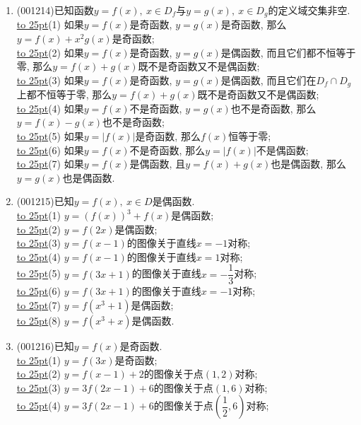 \documentclass[10pt,a4paper]{article}
\newcommand{\blank}[1]{\underline{\hbox to #1pt{}}}
\begin{document}
\begin{enumerate}[1.]
\blank{25}(10) 如果$y=(f(x))^2$是偶函数, 那么$y=f(x)$是偶函数或者是奇函数;\\ 
\blank{25}(11) 如果$y=(f(x))^2$是奇函数, 那么$y=f(x)$恒等于零, 因此是奇函数也是偶函数;\\ 
\blank{25}(12) 如果$y=(f(x))^3$是奇函数, 那么$y=f(x)$是奇函数.
\item {\tiny (001214)}已知函数$y=f(x),\ x \in D_f$与$y=g(x),\ x \in D_g$的定义域交集非空.\\ 
\blank{25}(1) 如果$y=f(x)$是奇函数, $y=g(x)$是奇函数, 那么$y=f(x)+x^2g(x)$是奇函数;\\ 
\blank{25}(2) 如果$y=f(x)$是奇函数, $y=g(x)$是偶函数, 而且它们都不恒等于零, 那么$y=f(x)+g(x)$既不是奇函数又不是偶函数;\\ 
\blank{25}(3) 如果$y=f(x)$是奇函数, $y=g(x)$是偶函数, 而且它们在$D_f\cap D_g$上都不恒等于零, 那么$y=f(x)+g(x)$既不是奇函数又不是偶函数;\\ 
\blank{25}(4) 如果$y=f(x)$不是奇函数, $y=g(x)$也不是奇函数, 那么$y=f(x)-g(x)$也不是奇函数;\\ 
\blank{25}(5) 如果$y=|f(x)|$是奇函数, 那么$f(x)$恒等于零;\\ 
\blank{25}(6) 如果$y=f(x)$不是奇函数, 那么$y=|f(x)|$不是偶函数;\\ 
\blank{25}(7) 如果$y=f(x)$是偶函数, 且$y=f(x)+g(x)$也是偶函数, 那么$y=g(x)$也是偶函数.
\item {\tiny (001215)}已知$y=f(x), \ x \in D$是偶函数.\\ 
\blank{25}(1) $y=(f(x))^3+f(x)$是偶函数;\\ 
\blank{25}(2) $y=f(2x)$是偶函数;\\ 
\blank{25}(3) $y=f(x-1)$的图像关于直线$x=-1$对称;\\ 
\blank{25}(4) $y=f(x-1)$的图像关于直线$x=1$对称;\\ 
\blank{25}(5) $y=f(3x+1)$的图像关于直线$x=-\dfrac{1}{3}$对称;\\ 
\blank{25}(6) $y=f(3x+1)$的图像关于直线$x=-1$对称;\\ 
\blank{25}(7) $y=f(x^3+1)$是偶函数;\\ 
\blank{25}(8) $y=f(x^3+x)$是偶函数.
\item {\tiny (001216)}已知$y=f(x)$是奇函数.\\ 
\blank{25}(1) $y=f(3x)$是奇函数;\\ 
\blank{25}(2) $y=f(x-1)+2$的图像关于点$(1,2)$对称;\\ 
\blank{25}(3) $y=3f(2x-1)+6$的图像关于点$(1,6)$对称;\\ 
\blank{25}(4) $y=3f(2x-1)+6$的图像关于点$(\dfrac{1}{2},6)$对称;\\ 

\end{enumerate}
\end{document}

